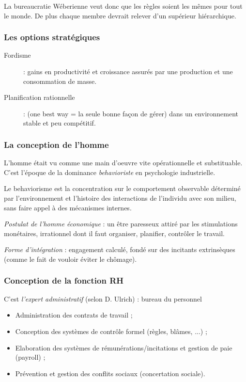 \documentclass[12pt]{article}
\begin{document}
		La bureaucratie Wéberienne veut donc que les règles soient les mêmes pour tout le monde. De plus chaque membre devrait relever d'un supérieur hiérarchique.
	  
	  \subsubsection{Les options stratégiques}
	  \begin{description}
	   \item[Fordisme] : gains en productivité et croissance assurés par une production et une consommation de masse.
	   \item[Planification rationnelle] : (one best way = la seule bonne façon de gérer) dans un environnement stable et peu compétitif. 
	  \end{description}

	  \subsubsection{La conception de l'homme}
	  
	  L'homme était vu comme une main d'oeuvre vite opérationnelle et substituable. C'est l'époque de la dominance \textit{behavioriste} en psychologie industrielle.
	  
	  Le behaviorisme est la concentration sur le comportement observable déterminé par l'environnement et l'histoire des interactions de l'individu avec son milieu, sans faire appel à des mécanismes internes.
	  
	  \emph{Postulat de l'homme économique} : un être paresseux attiré par les stimulations monétaires, irrationnel dont il faut organiser, planifier, contrôler le travail.
	  
	  \emph{Forme d'intégration} : engagement calculé, fondé sur des incitants extrinsèques (comme le fait de vouloir éviter le chômage).
	  
	  \subsubsection{Conception de la fonction RH}
	  
	  C'est \emph{l'expert administratif} (selon D. Ulrich) : \og{} bureau du personnel \fg{}
	  
	  \begin{itemize}
	   \item Administration des contrats de travail ;
	   \item Conception des systèmes de contrôle formel (règles, blâmes, ...) ;
	   \item Elaboration des systèmes de rémunérations/incitations et gestion de paie (payroll) ;
	   \item Prévention et gestion des conflits sociaux (concertation sociale). 
	  \end{itemize}
	  
\end{document}
